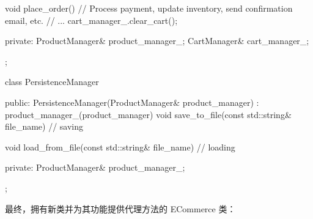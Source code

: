 \begin{cpp}
{    void place_order() {
        // Process payment, update inventory, send confirmation email,
        etc.
        // ...
        cart_manager_.clear_cart();
    }

private:
    ProductManager& product_manager_;
    CartManager& cart_manager_;
};

class PersistenceManager {
public:
    PersistenceManager(ProductManager& product_manager)
        : product_manager_(product_manager) {}
    void save_to_file(const std::string& file_name) {
        // saving
    }

    void load_from_file(const std::string& file_name) {
        // loading
    }

private:
    ProductManager& product_manager_;
};
\end{cpp}

最终，拥有新类并为其功能提供代理方法的 ECommerce 类：

